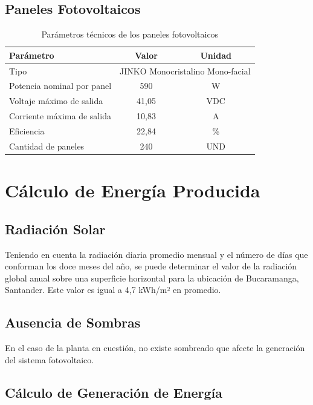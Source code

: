 \subsection{Paneles Fotovoltaicos}

\begin{table}[H]
    \centering
    \caption{Parámetros técnicos de los paneles fotovoltaicos}
    \begin{tabular}{lcc}
    \toprule
    \textbf{Parámetro} & \textbf{Valor} & \textbf{Unidad} \\
    \midrule
    Tipo & \multicolumn{2}{l}{JINKO Monocristalino Mono-facial} \\
    Potencia nominal por panel & 590 & W \\
    Voltaje máximo de salida & 41,05 & VDC \\
    Corriente máxima de salida & 10,83 & A \\
    Eficiencia & 22,84 & \% \\
    Cantidad de paneles & 240 & UND \\
    \bottomrule
    \end{tabular}
\end{table}

\section{Cálculo de Energía Producida}

\subsection{Radiación Solar}

Teniendo en cuenta la radiación diaria promedio mensual y el número de días que conforman los doce meses del año, se puede determinar el valor de la radiación global anual sobre una superficie horizontal para la ubicación de Bucaramanga, Santander. Este valor es igual a 4,7 kWh/m² en promedio.

\subsection{Ausencia de Sombras}

En el caso de la planta en cuestión, no existe sombreado que afecte la generación del sistema fotovoltaico.

\subsection{Cálculo de Generación de Energía}

